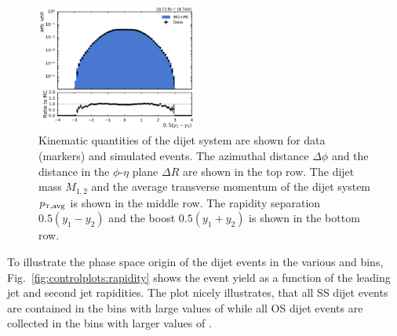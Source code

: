 \begin{figure}[htbp]
    \includegraphics[width=0.47\textwidth]{figures/measurement/dijet_quantities_dijet_ystar.pdf}
    \caption[Kinematic quantities of the dijet system]{Kinematic quantities of
    the dijet system are shown for data (markers) and simulated events. The
    azimuthal distance $\Delta\phi$ and the distance in the $\phi$-$\eta$ plane
    $\Delta R$ are shown in the top row. The dijet mass $M_{1,2}$ and the average
    transverse momentum of the dijet system $\ptavg$ is shown in the middle row. The
    rapidity separation $0.5(y_1 - y_2)$ and the boost $0.5(y_1+y_2)$ is shown in
    the bottom row.}
    \label{fig:controlplots:dijets}
\end{figure}

To illustrate the phase space origin of the dijet events in the various \ystar
and \yboost bins, Fig.~\ref{fig:controlplots:rapidity} shows the event yield as
a function of the leading jet and second jet rapidities. The plot nicely
illustrates, that all SS dijet events are contained in the bins with
large values of \yboost while all OS dijet events are collected in the bins with
larger values of \ystar.

